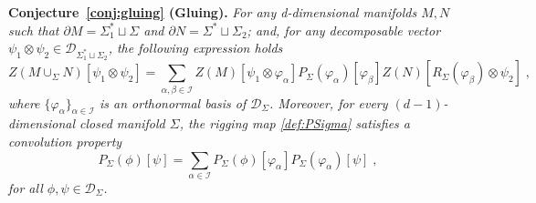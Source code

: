 \documentclass[11pt]{article}
\newcommand{\cD}{\mathcal{D}}
\theoremstyle{definition}
\numberwithin{equation}{section}
\begin{document}
\noindent
\textbf{Conjecture~\ref{conj:gluing} (Gluing).}\emph{
    For any d-dimensional manifolds $M,N$ such that $\partial M=\Sigma_1^*\sqcup \Sigma$ and $\partial N=\Sigma^*\sqcup \Sigma_2$; and, for any decomposable vector $\psi_1\otimes \psi_2\in\mathcal{D}_{\Sigma_1^*\sqcup\Sigma_2}$, the following expression holds
    \begin{equation}\label{eq:gluingconv}
        Z(M\cup_\Sigma N)[\psi_1\otimes\psi_2]=\sum_{\alpha,\beta\in\mathscr I}Z(M)[\psi_1\otimes \varphi_\alpha]P_{\Sigma}(\varphi_\alpha)[\varphi_\beta]Z(N)[R_\Sigma(\varphi_\beta)\otimes\psi_2]\;,
    \end{equation}
    where $\{\varphi_\alpha\}_{\alpha\in\mathscr I}$ is an orthonormal basis of $\mathcal{D}_{\Sigma}$. Moreover, for every $(d-1)$-dimensional closed manifold $\Sigma$, the rigging map \eqref{def:PSigma} satisfies a convolution property
    \begin{equation}\label{eq:Pconvolution}
        P_{\Sigma}(\phi)[\psi]=\sum_{\alpha\in\mathscr I}P_{\Sigma}(\phi)[\varphi_\alpha]P_{\Sigma}(\varphi_\alpha)[\psi]\;,
    \end{equation}
   for all $\phi,\psi\in\cD_{\Sigma}$.}
   \medskip
\end{document}
